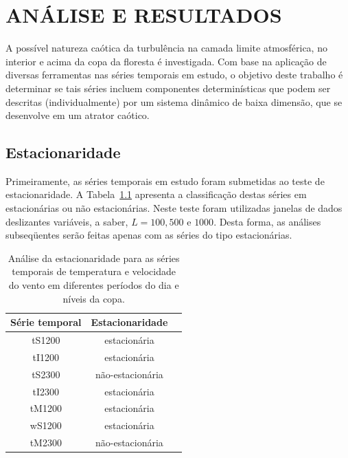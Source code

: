 
\chapter{ANÁLISE E RESULTADOS}
\label{capanaliseseresults}

A possível natureza caótica da turbulência na camada limite atmosférica, no interior e acima da copa da floresta é investigada. Com base na aplicação de diversas ferramentas
nas séries temporais em estudo, o objetivo deste trabalho é determinar se tais séries incluem componentes determinísticas que podem ser descritas (individualmente) por um sistema dinâmico de baixa dimensão, que se desenvolve em um atrator caótico.


\section{Estacionaridade}
Primeiramente, as séries temporais em estudo foram submetidas ao teste de estacionaridade.
A Tabela~\ref{tabelatempestacionaria} apresenta a classificação destas séries em estacionárias ou não estacionárias. Neste teste foram utilizadas janelas de dados deslizantes variáveis, a saber, $L=100,500$ e $1000$. Desta forma, as análises subseqüentes serão feitas apenas com as séries do tipo estacionárias.

\begin{table}[!ht]
\begin{center}
\caption{Análise da estacionaridade para as séries temporais de temperatura e velocidade do vento em diferentes períodos do dia e níveis da copa.}
\begin{tabular}{c c c}
\hline 
\textbf{Série temporal} & \textbf{Estacionaridade} \\
\hline
tS1200 & estacionária \\
tI1200 & estacionária \\
tS2300 & não-estacionária \\
tI2300 & estacionária \\
tM1200 & estacionária \\
wS1200 & estacionária \\
tM2300 & não-estacionária \\
\hline
\end{tabular}
\label{tabelatempestacionaria}
\end{center}
\end{table}

